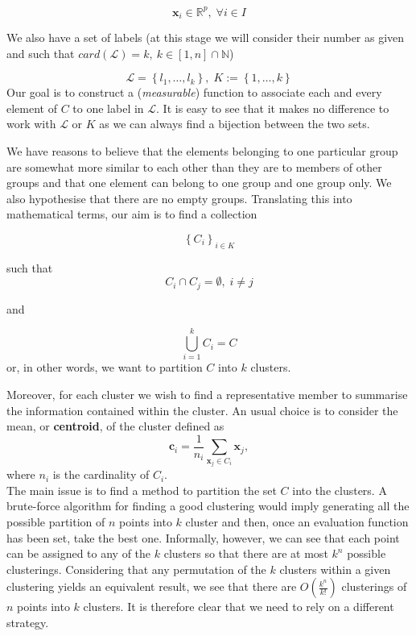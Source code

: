 \documentclass[a4paper]{article}
\begin{document}
	$$ \boldsymbol{x}_{i} \in \mathbb{R}^{p},\;\forall i\in I$$
	
	
	We also have a set of labels (at this stage we will consider their
	number as given and such that $card(\mathcal{L})=k,\:k\in\left[1,n\right]\cap\mathbb{N}$)
	
	$$
	\mathcal{L}=\left\{ l_{1},\ldots,l_{k}\right\} ,\;K:=\left\{ 1,\ldots,k\right\} 
	$$
	Our goal is to construct a (\textit{measurable}) function to associate each
	and every element of $C$ to one label in $\mathcal{L}$. It is easy
	to see that it makes no difference to work with $\mathcal{L}$ or
	$K$ as we can always find a bijection between the two sets.
	
	We have reasons to believe that the elements belonging to one particular
	group are somewhat more similar to each other than they are to members
	of other groups and that one element can belong to one group and one
	group only. We also hypothesise that there are no empty groups. Translating
	this into mathematical terms, our aim is to find a collection
	
	$$ 	\left\{ C_{i}\right\} _{i\in K}	$$
	
	such that
	$$ C_{i}\cap C_{j}=\emptyset,\;i\neq j $$
	
	and
	
	$$
	\bigcup_{i=1}^{k} C_{i} = C
	$$
	or, in other words, we want to partition $C$ into $k$ clusters.
	
	Moreover, for each cluster we wish to find a representative member to summarise the information contained within the cluster. An usual choice is to consider the mean, or \textbf{centroid}, of the cluster defined as
	\begin{equation*}
	\boldsymbol{c}_{i} = \frac{1}{n_{i}} \sum_{\boldsymbol{x}_{j} \in C_{i}} \boldsymbol{x}_{j},
	\end{equation*}
	where $n_{i}$ is the cardinality of $C_{i}$.\\
	
	The main issue is to find a method to partition the set $C$ into
	the clusters. A brute-force algorithm for finding a good clustering would imply generating all the possible partition of $n$ points into $k$ cluster and then, once an evaluation function has been set, take the best one. Informally, however, we can see that each point can be assigned to any of the $k$ clusters so that there are at most $k^{n}$ possible clusterings. Considering that any permutation of the $k$ clusters within a given clustering yields an equivalent result, we see that there are $O(\frac{k^{n}}{k!})$ clusterings of $n$ points into $k$ clusters. It is therefore clear that we need to rely on a different strategy.\\
	
\end{document}
